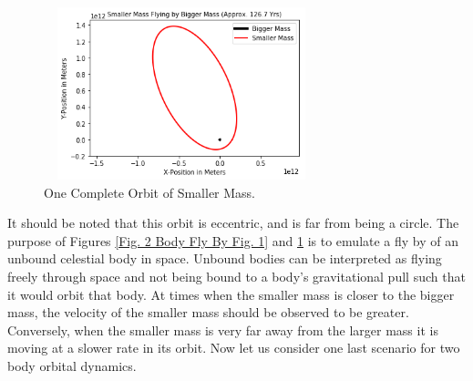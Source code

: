 \documentclass[twocolumn]{article}
\begin{document}
\begin{figure}[h]
    \centering
    \includegraphics[width=8cm, height=5cm]{Figures/2-Body Fly By (2).png}
    \caption{\small{One Complete Orbit of Smaller Mass.}}
    \label{Fig. 2 Body Fly By Fig. 2}
\end{figure}
\par \noindent
It should be noted that this orbit is eccentric, and is far from being a circle. The purpose of Figures \ref{Fig. 2 Body Fly By Fig. 1} and \ref{Fig. 2 Body Fly By Fig. 2} is to emulate a fly by of an unbound celestial body in space. Unbound bodies can be interpreted as flying freely through space and not being bound to a body's gravitational pull such that it would orbit that body. At times when the smaller mass is closer to the bigger mass, the velocity of the smaller mass should be observed to be greater. Conversely, when the smaller mass is very far away from the larger mass it is moving at a slower rate in its orbit. Now let us consider one last scenario for two body orbital dynamics.
\end{document}
